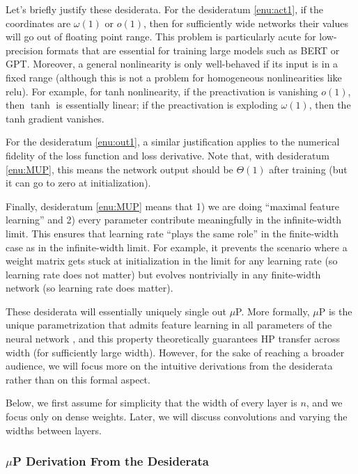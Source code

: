 \documentclass{article}
\theoremstyle{definition}
\begin{document}
    Let's briefly justify these desiderata. For the desideratum \ref{enu:act1}, if the coordinates are $\omega(1)$ or $o(1)$, then for sufficiently wide networks their values will go out of floating point range. This problem is particularly acute for low-precision formats that are essential for training large models such as BERT or GPT. Moreover, a general nonlinearity is only well-behaved if its input is in a fixed range (although this is not a problem for homogeneous nonlinearities like relu). For example, for tanh nonlinearity, if the preactivation is vanishing $o(1)$, then $\tanh$ is essentially linear; if the preactivation is exploding $\omega(1)$, then the tanh gradient vanishes.
    
    For the desideratum \ref{enu:out1}, a similar justification applies to the numerical fidelity of the loss function and loss derivative.
    Note that, with desideratum \ref{enu:MUP}, this means the network output should be $\Theta(1)$ after training (but it can go to zero at initialization).
    
    Finally, desideratum \ref{enu:MUP} means that 1) we are doing ``maximal feature learning'' \citep{TP4} and 2) every parameter contribute meaningfully in the infinite-width limit. This ensures that learning rate ``plays the same role'' in the finite-width case as in the infinite-width limit. For example, it prevents the scenario where a weight matrix gets stuck at initialization in the limit for any learning rate (so learning rate does not matter) but evolves nontrivially in any finite-width network (so learning rate does matter).
    
    These desiderata will essentially uniquely single out $\mu$P.
    More formally, $\mu$P is the unique parametrization that admits feature learning in all parameters of the neural network \citep{TP4}, and this property theoretically guarantees HP transfer across width (for sufficiently large width).
    However, for the sake of reaching a broader audience, we will focus more on the intuitive derivations from the desiderata rather than on this formal aspect.
    
    Below, we first assume for simplicity that the width of every layer is $n$, and we focus only on dense weights. Later, we will discuss convolutions and varying the widths between layers.
    
    \subsubsection{\texorpdfstring{$\mu$P}{MUP} Derivation From the Desiderata}
    \label{sec:MUPDerivation}
\end{document}
